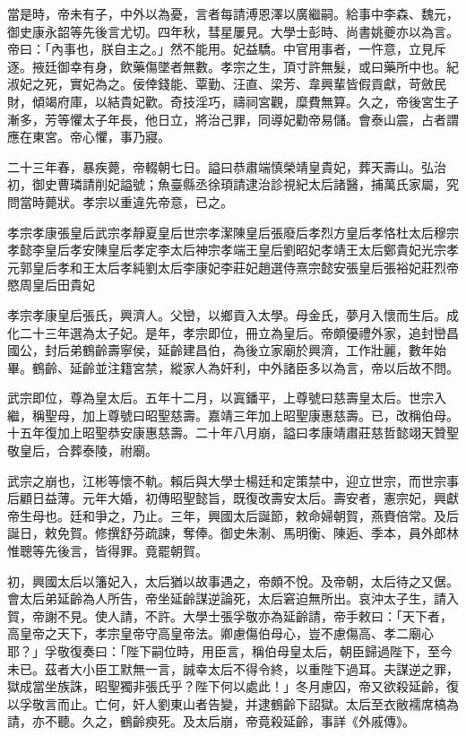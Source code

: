 當是時，帝未有子，中外以為憂，言者每請溥恩澤以廣繼嗣。給事中李森、魏元，御史康永韶等先後言尤切。四年秋，彗星屢見。大學士彭時、尚書姚夔亦以為言。帝曰：「內事也，朕自主之。」然不能用。妃益驕。中官用事者，一忤意，立見斥逐。掖廷御幸有身，飲藥傷墜者無數。孝宗之生，頂寸許無髮，或曰藥所中也。紀淑妃之死，實妃為之。佞倖錢能、覃勤、汪直、梁芳、韋興輩皆假貢獻，苛斂民財，傾竭府庫，以結貴妃歡。奇技淫巧，禱祠宮觀，糜費無算。久之，帝後宮生子漸多，芳等懼太子年長，他日立，將治己罪，同導妃勸帝易儲。會泰山震，占者謂應在東宮。帝心懼，事乃寢。

二十三年春，暴疾薨，帝輟朝七日。謚曰恭肅端慎榮靖皇貴妃，葬天壽山。弘治初，御史曹璘請削妃謚號；魚臺縣丞徐頊請逮治診視紀太后諸醫，捕萬氏家屬，究問當時薨狀。孝宗以重違先帝意，已之。

孝宗孝康張皇后武宗孝靜夏皇后世宗孝潔陳皇后張廢后孝烈方皇后孝恪杜太后穆宗孝懿李皇后孝安陳皇后孝定李太后神宗孝端王皇后劉昭妃孝靖王太后鄭貴妃光宗孝元郭皇后孝和王太后孝純劉太后李康妃李莊妃趙選侍熹宗懿安張皇后張裕妃莊烈帝愍周皇后田貴妃

孝宗孝康皇后張氏，興濟人。父巒，以鄉貢入太學。母金氏，夢月入懷而生后。成化二十三年選為太子妃。是年，孝宗即位，冊立為皇后。帝頗優禮外家，追封巒昌國公，封后弟鶴齡壽寧侯，延齡建昌伯，為後立家廟於興濟，工作壯麗，數年始畢。鶴齡、延齡並注籍宮禁，縱家人為奸利，中外諸臣多以為言，帝以后故不問。

武宗即位，尊為皇太后。五年十二月，以寘鐇平，上尊號曰慈壽皇太后。世宗入繼，稱聖母，加上尊號曰昭聖慈壽。嘉靖三年加上昭聖康惠慈壽。已，改稱伯母。十五年復加上昭聖恭安康惠慈壽。二十年八月崩，謚曰孝康靖肅莊慈哲懿翊天贊聖敬皇后，合葬泰陵，祔廟。

武宗之崩也，江彬等懷不軌。賴后與大學士楊廷和定策禁中，迎立世宗，而世宗事后顧日益薄。元年大婚，初傳昭聖懿旨，既復改壽安太后。壽安者，憲宗妃，興獻帝生母也。廷和爭之，乃止。三年，興國太后誕節，敕命婦朝賀，燕賚倍常。及后誕日，敕免賀。修撰舒芬疏諫，奪俸。御史朱淛、馬明衡、陳逅、季本，員外郎林惟聰等先後言，皆得罪。竟罷朝賀。

初，興國太后以籓妃入，太后猶以故事遇之，帝頗不悅。及帝朝，太后待之又倨。會太后弟延齡為人所告，帝坐延齡謀逆論死，太后窘迫無所出。哀沖太子生，請入賀，帝謝不見。使人請，不許。大學士張孚敬亦為延齡請，帝手敕曰：「天下者，高皇帝之天下，孝宗皇帝守高皇帝法。卿慮傷伯母心，豈不慮傷高、孝二廟心耶？」孚敬復奏曰：「陛下嗣位時，用臣言，稱伯母皇太后，朝臣歸過陛下，至今未已。茲者大小臣工默無一言，誠幸太后不得令終，以重陛下過耳。夫謀逆之罪，獄成當坐族誅，昭聖獨非張氏乎？陛下何以處此！」冬月慮囚，帝又欲殺延齡，復以孚敬言而止。亡何，奸人劉東山者告變，并逮鶴齡下詔獄。太后至衣敝襦席槁為請，亦不聽。久之，鶴齡瘐死。及太后崩，帝竟殺延齡，事詳《外戚傳》。

